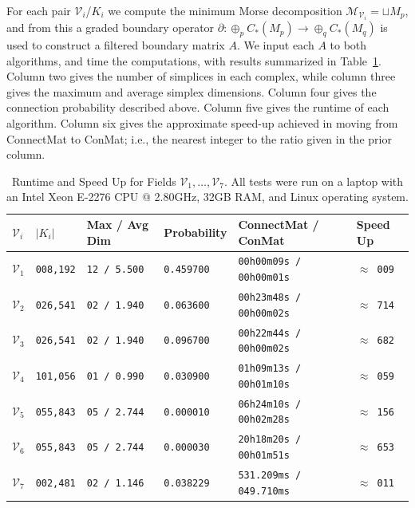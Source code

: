 \documentclass[a4paper,english,cleveref]{article}
\theoremstyle{plain}
\newcounter{li}
\newcommand{\mv}{\mathcal{V}}
\newcommand{\md}{\mathcal{M}}
\begin{document}
For each pair $\mv_i$/$K_i$ we compute the minimum Morse decomposition $\md_{\mv_i} = \sqcup M_p$, and from this a graded boundary operator $\partial: \oplus_pC_*(M_p)\rightarrow \oplus_qC_*(M_q)$ is used to construct a filtered boundary matrix $A$. We input each $A$ to both algorithms, and time the computations, with results summarized in Table~\ref{tab:benchmarks}. Column two gives the number of simplices in each complex, while column three gives the maximum and average simplex dimensions. Column four gives the connection probability described above. Column five gives the runtime of each algorithm. Column six gives the approximate speed-up achieved in moving from {\sc ConnectMat} to {\sc ConMat}; i.e., the nearest integer to the ratio given in the prior column.

\begin{table}[H]
\centering
\begin{tabular}{
>{\raggedright\arraybackslash}p{.5cm} 
>{\raggedright\arraybackslash}p{1.25cm} 
>{\raggedright\arraybackslash}p{2.5cm} 
>{\raggedright\arraybackslash}p{1.5cm} 
>{\raggedright\arraybackslash}p{4cm} 
>{\raggedleft\arraybackslash}p{1.5cm}
}
\hline
$\mv_i$ & $|K_i|$ & Max / Avg Dim & Probability & {\sc ConnectMat} / {\sc ConMat} & Speed Up \\
\hline
$\mv_1$ & \texttt{008,192} & \texttt{12 / 5.500} & \texttt{0.459700} & \texttt{00h00m09s / 00h00m01s} & $\approx $\texttt{  009} \\
$\mv_2$ & \texttt{026,541} & \texttt{02 / 1.940} & \texttt{0.063600} & \texttt{00h23m48s / 00h00m02s} & $\approx $\texttt{  714} \\
$\mv_3$ & \texttt{026,541} & \texttt{02 / 1.940} & \texttt{0.096700} & \texttt{00h22m44s / 00h00m02s} & $\approx $\texttt{  682} \\
$\mv_4$ & \texttt{101,056} & \texttt{01 / 0.990} & \texttt{0.030900} & \texttt{01h09m13s / 00h01m10s} & $\approx $\texttt{  059} \\
$\mv_5$ & \texttt{055,843} & \texttt{05 / 2.744} & \texttt{0.000010} & \texttt{06h24m10s / 00h02m28s} & $\approx $\texttt{  156} \\
$\mv_6$ & \texttt{055,843} & \texttt{05 / 2.744} & \texttt{0.000030} & \texttt{20h18m20s / 00h01m51s} & $\approx $\texttt{  653} \\
$\mv_7$ & \texttt{002,481} & \texttt{02 / 1.146} & \texttt{0.038229} & \texttt{531.209ms / 049.710ms} & $\approx $\texttt{  011} \\
\hline
\end{tabular}
\caption{Runtime and Speed Up for Fields $\mv_1, \ldots, \mv_7$. All tests were run on a laptop with an Intel Xeon E-2276 CPU @ 2.80GHz, 32GB RAM, and Linux operating system.} \label{tab:benchmarks}
\end{table}
\end{document}
